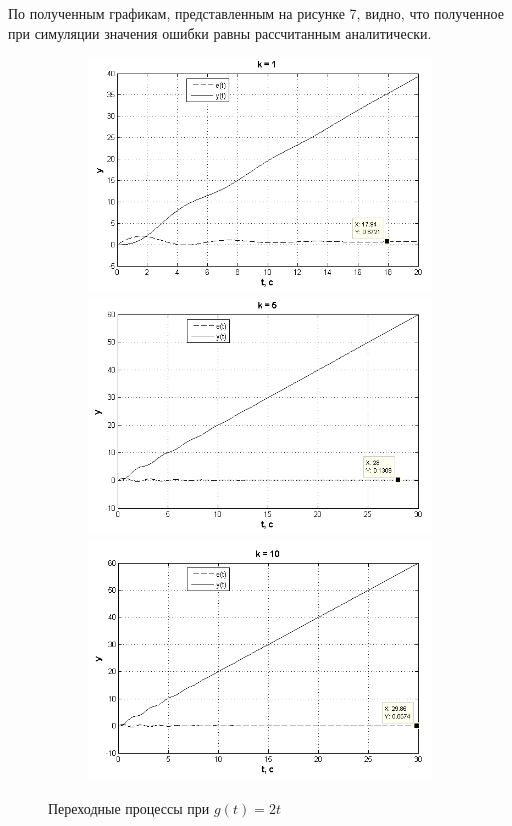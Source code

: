 \documentclass[a4paper, 11pt, russian]{article}
\begin{document}
    По полученным графикам, представленным на рисунке 7, видно, что полученное при симуляции значения ошибки равны рассчитанным аналитически.
    \begin{figure}[h!]
        \centering
        \begin{subfigure}{0.65\textwidth}
            \includegraphics[width = \textwidth]{vInput1ast1k.png}
            \includegraphics[width = \textwidth]{vInput1ast5k.png}
            \includegraphics[width = \textwidth]{vInput1ast10k.png}
        \end{subfigure}
        \caption{Переходные процессы при $g(t) = 2t$}
    \end{figure}
    
\end{document}
